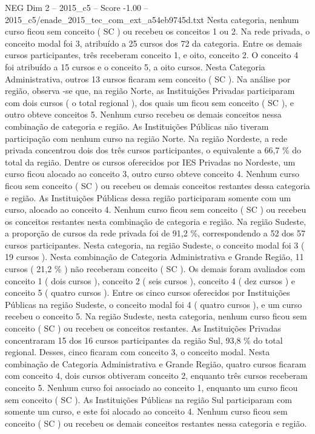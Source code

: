 \begin{textsample}{NEG Dim 2 – 2015\_c5 – Score -1.00 – 2015\_c5/enade\_2015\_tec\_com\_ext\_a54eb9745d.txt}
Nesta categoria, nenhum curso ficou sem conceito ( SC ) ou recebeu os conceitos 1 ou 2.
Na rede privada, o conceito modal foi 3, atribuído a 25 cursos dos 72 da categoria.
Entre os demais cursos participantes, três receberam conceito 1, e oito, conceito 2.
O conceito 4 foi atribuído a 15 cursos e o conceito 5, a oito cursos.
Nesta Categoria Administrativa, outros 13 cursos ficaram sem conceito ( SC ).
Na análise por região, observa -se que, na região Norte, as Instituições Privadas participaram com dois cursos ( o total regional ), dos quais um ficou sem conceito ( SC ), e outro obteve conceitos 5.
Nenhum curso recebeu os demais conceitos nessa combinação de categoria e região.
As Instituições Públicas não tiveram participação com nenhum curso na região Norte.
Na região Nordeste, a rede privada concentrou dois dos três cursos participantes, o equivalente a 66,7 \% do total da região.
Dentre os cursos oferecidos por IES Privadas no Nordeste, um curso ficou alocado ao conceito 3, outro curso obteve conceito 4.
Nenhum curso ficou sem conceito ( SC ) ou recebeu os demais conceitos restantes dessa categoria e região.
As Instituições Públicas dessa região participaram somente com um curso, alocado ao conceito 4.
Nenhum curso ficou sem conceito ( SC ) ou recebeu os conceitos restantes nesta combinação de categoria e região.
Na região Sudeste, a proporção de cursos da rede privada foi de 91,2 \%, correspondendo a 52 dos 57 cursos participantes.
Nesta categoria, na região Sudeste, o conceito modal foi 3 ( 19 cursos ).
Nesta combinação de Categoria Administrativa e Grande Região, 11 cursos ( 21,2 \% ) não receberam conceito ( SC ).
Os demais foram avaliados com conceito 1 ( dois cursos ), conceito 2 ( seis cursos ), conceito 4 ( dez cursos ) e conceito 5 ( quatro cursos ).
Entre os cinco cursos oferecidos por Instituições Públicas na região Sudeste, o conceito modal foi 4 ( quatro cursos ), e um curso recebeu o conceito 5.
Na região Sudeste, nesta categoria, nenhum curso ficou sem conceito ( SC ) ou recebeu os conceitos restantes.
As Instituições Privadas concentraram 15 dos 16 cursos participantes da região Sul, 93,8 \% do total regional.
Desses, cinco ficaram com conceito 3, o conceito modal.
Nesta combinação de Categoria Administrativa e Grande Região, quatro cursos ficaram com conceito 4, dois cursos obtiveram conceito 2, enquanto três cursos receberam conceito 5.
Nenhum curso foi associado ao conceito 1, enquanto um curso ficou sem conceito ( SC ).
As Instituições Públicas na região Sul participaram com somente um curso, e este foi alocado ao conceito 4.
Nenhum curso ficou sem conceito ( SC ) ou recebeu os demais conceitos restantes nessa categoria e região.

\end{textsample}
